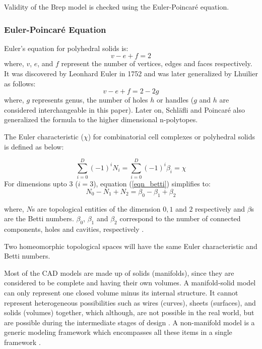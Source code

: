 Validity of the Brep model is checked using the Euler-Poincar\'e equation.

\subsubsection{Euler-Poincar\'e Equation}
Euler's equation for polyhedral solids is: $$v - e + f = 2$$ where, $v$, $e$, and $f$ represent the number of vertices, edges and faces respectively. It was discovered by Leonhard Euler in 1752 and was later generalized by Lhuilier \cite{Krishnamurti2002} as follows: $$v - e + f = 2 - 2g$$ where, $g$ represents genus, the number of holes $h$ or handles ($g$ and $h$ are considered interchangeable in this paper). Later on, Schläfli and Poincar\'e also generalized the formula to the higher dimensional n-polytopes. 

The Euler characteristic ($\chi$) for combinatorial cell complexes or polyhedral solids is defined as below:

\begin{equation}
\sum_{i=0 }^D(-1)^{i} N_{i}= \sum_{i=0}^D(-1)^{i} \beta_{i} = \chi 
\label{eqn_betti}
\end{equation}
For dimensions upto 3 ($i=3$), equation (\ref{eqn_betti}) simplifies to:
\begin{equation}
N_{0}-N_{1}+N_{2}= \beta_{0} -\beta_{1} + \beta_{2}
\label{eqn_betti3}
\end{equation}

where, $N$s are topological entities of the dimension $0,1$ and $2$ respectively and $\beta$s are the Betti numbers. $\beta_{0}$, $\beta_{1}$ and $\beta_{2}$ correspond to  the number of connected components, holes and cavities, respectively \cite{Sequin}. 

Two homeomorphic topological spaces will have the same Euler characteristic and Betti numbers.

Most of the CAD models are made up of solids (manifolds), since they are considered to be complete and  having their own volumes. A manifold-solid model  can only represent one closed volume minus its internal structure. It cannot represent  heterogeneous possibilities such as wires (curves),  sheets (surfaces),  and  solids (volumes) together, which although, are not possible in the real world, but are possible during the intermediate stages of design \cite{Yamaguchi1995}. A non-manifold model is a generic modeling framework which encompasses all these items in a single framework \cite{Lee2001}.

